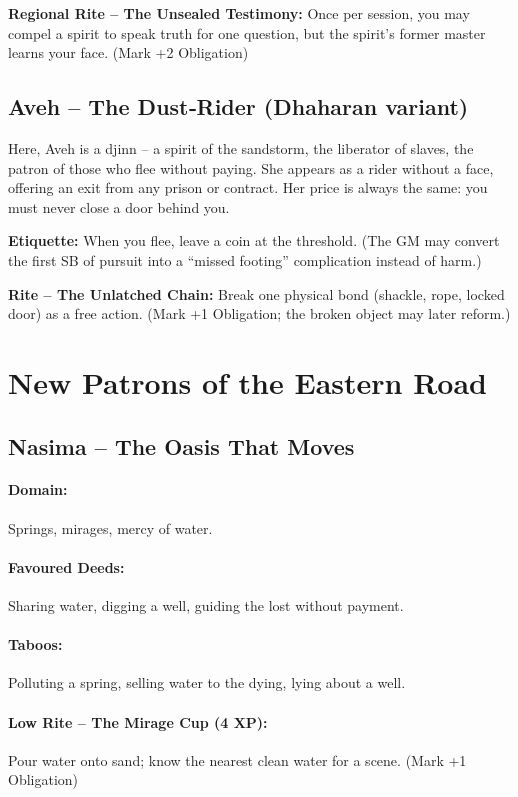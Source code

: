 \documentclass[11pt]{book}
\begin{document}
\textbf{Regional Rite -- The Unsealed Testimony:} Once per session, you may compel a spirit to speak truth for one question, but the spirit’s former master learns your face. (Mark +2 Obligation)

\subsection{Aveh – The Dust‑Rider (Dhaharan variant)}
Here, Aveh is a djinn -- a spirit of the sandstorm, the liberator of slaves, the patron of those who flee without paying. She appears as a rider without a face, offering an exit from any prison or contract. Her price is always the same: you must never close a door behind you.

\textbf{Etiquette:} When you flee, leave a coin at the threshold. (The GM may convert the first SB of pursuit into a “missed footing” complication instead of harm.)

\textbf{Rite -- The Unlatched Chain:} Break one physical bond (shackle, rope, locked door) as a free action. (Mark +1 Obligation; the broken object may later reform.)

\section{New Patrons of the Eastern Road}

\subsection{Nasima – The Oasis That Moves}
\paragraph{Domain:} Springs, mirages, mercy of water.
\paragraph{Favoured Deeds:} Sharing water, digging a well, guiding the lost without payment.
\paragraph{Taboos:} Polluting a spring, selling water to the dying, lying about a well.
\paragraph{Low Rite -- The Mirage Cup (4 XP):} Pour water onto sand; know the nearest clean water for a scene. (Mark +1 Obligation)
\end{document}
